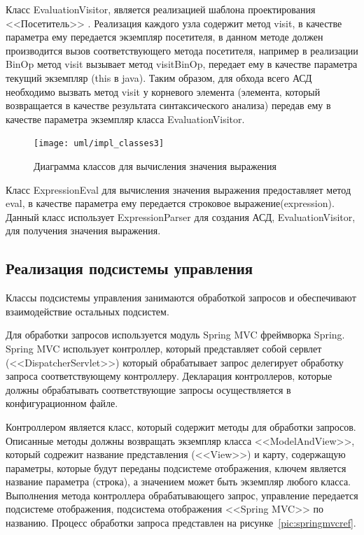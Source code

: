 \documentclass[14pt,a4paper]{reportmod}
\begin{document}
Класс EvaluationVisitor, является реализацией шаблона проектирования <<Посетитель>> \cite{patterni}. Реализация каждого узла содержит метод visit, в качестве параметра ему передается экземпляр посетителя, в данном методе должен производится вызов соответствующего метода посетителя, например в реализации BinOp метод visit вызывает метод visitBinOp, передает ему в качестве параметра текущий экземпляр (this в java). Таким образом, для обхода всего АСД необходимо вызвать метод visit у корневого элемента (элемента, который возвращается в качестве результата синтаксического анализа) передав ему в качестве параметра экземпляр класса EvaluationVisitor.

\begin{figure}
  \centering
  \texttt{[image: uml/impl\_classes3]}
  \caption{Диаграмма классов для вычисления значения выражения}
  \label{pic:evalclasses}
\end{figure}

Класс ExpressionEval для вычисления значения выражения предоставляет метод eval, в качестве параметра ему передается строковое выражение(expression). Данный класс использует ExpressionParser для создания АСД, EvaluationVisitor, для получения значения выражения.

\subsection{Реализация подсистемы управления}

Классы подсистемы управления занимаются обработкой запросов и обеспечивают взаимодействие остальных подсистем.


Для обработки запросов используется модуль Spring MVC фреймворка Spring. Spring MVC использует контроллер, который представляет собой сервлет (<<DispatcherServlet>>) который обрабатывает запрос делегирует обработку запроса соответствующему контроллеру. Декларация контроллеров, которые должны обрабатывать соответствующие запросы осуществляется в конфигурационном файле.


Контроллером является класс, который содержит методы для обработки запросов. Описанные методы должны возвращать экземпляр класса <<ModelAndView>>, который содрежит название представления (<<View>>) и карту, содержащую параметры, которые будут переданы подсистеме отображения, ключем является название параметра (строка), а значением может быть экземпляр любого класса. Выполнения метода контроллера обрабатывающего запрос, управление передается подсистеме отображения, подсистема отображения <<Spring MVC>> по названию. Процесс обработки запроса представлен на рисунке~\ref{pic:springmvcref}.
\end{document}
